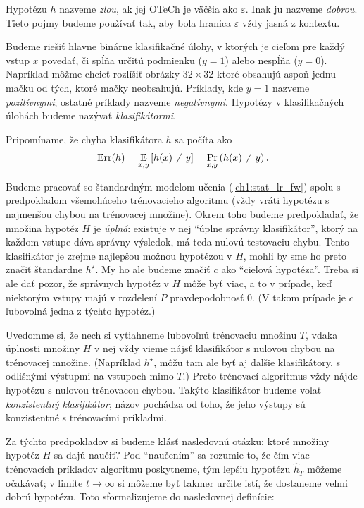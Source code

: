 Hypotézu $h$ nazveme \emph{zlou}, ak jej OTeCh je väčšia ako $\varepsilon$.
Inak ju nazveme \emph{dobrou}. Tieto pojmy budeme používať tak, aby bola
hranica $\varepsilon$ vždy jasná z kontextu.

Budeme riešiť hlavne binárne klasifikačné úlohy, v ktorých je cieľom pre
každý vstup $x$ povedať, či spĺňa určitú podmienku ($y = 1$) alebo nespĺňa
($y = 0$). Napríklad môžme chcieť rozlíšiť obrázky $32 \times 32$ ktoré
obsahujú aspoň jednu mačku od tých, ktoré mačky neobsahujú. Príklady,
kde $y = 1$ nazveme \emph{pozitívnymi}; ostatné príklady nazveme
\emph{negatívnymi}. Hypotézy v klasifikačných úlohách budeme nazývať
\emph{klasifikátormi}.

Pripomíname, že chyba klasifikátora $h$ sa počíta ako
$$ \mathrm{Err}(h) = \operatorname*{\mathrm{E}}_{x, y} \left[ h(x) \neq y \right] = \operatorname*{\mathrm{Pr}}_{x, y} \left( h(x) \neq y \right). $$

Budeme pracovať so štandardným modelom učenia (\ref{ch1:stat_lr_fw})
spolu s predpokladom všemohúceho trénovacieho algoritmu (vždy vráti
hypotézu s najmenšou chybou na trénovacej množine). Okrem toho budeme
predpokladať, že množina hypotéz $H$ je \emph{úplná}: existuje v nej
``úplne správny klasifikátor'', ktorý na každom vstupe dáva
správny výsledok, má teda nulovú testovaciu chybu. Tento klasifikátor
je zrejme najlepšou možnou hypotézou v $H$, mohli by sme ho preto značiť
štandardne $h^\star$. My ho ale budeme značiť $c$ ako ``cieľová hypotéza''.
Treba si ale dať pozor, že správnych hypotéz v $H$ môže byť viac, a to
v prípade, keď niektorým vstupy majú v rozdelení $P$ pravdepodobnosť $0$.
(V takom prípade je $c$ ľubovoľná jedna z týchto hypotéz.)

Uvedomme si, že nech si vytiahneme ľubovoľnú trénovaciu množinu $T$,
vďaka úplnosti množiny $H$ v nej vždy vieme nájsť klasifikátor s nulovou
chybou na trénovacej množine. (Napríklad $h^\star$, môžu tam ale byť
aj ďalšie klasifikátory, s odlišnými výstupmi na vstupoch mimo $T$.) Preto
trénovací algoritmus vždy nájde hypotézu s nulovou trénovacou chybou.
Takýto klasifikátor budeme volať \emph{konzistentný klasifikátor};
názov pochádza od toho, že jeho výstupy sú konzistentné s trénovacími
príkladmi.

Za týchto predpokladov si budeme klásť nasledovnú otázku: ktoré
množiny hypotéz $H$ sa dajú naučiť? Pod ``naučením'' sa rozumie to,
že čím viac trénovacích príkladov algoritmu poskytneme, tým lepšiu
hypotézu $\hat{h}_T$ môžeme očakávať; v limite $t \to \infty$ si
môžeme byť takmer určite istí, že dostaneme veľmi dobrú hypotézu.
Toto sformalizujeme do nasledovnej definície:

